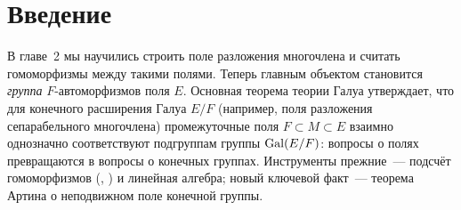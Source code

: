 \section*{Введение}

В главе~2 мы научились строить поле разложения многочлена и считать гомоморфизмы между такими полями. Теперь главным
объектом становится \emph{группа} $F$-автоморфизмов поля $E$. Основная теорема теории Галуа утверждает, что для
конечного расширения Галуа $E/F$ (например, поля разложения сепарабельного многочлена) промежуточные поля $F\subset M\subset E$
взаимно однозначно соответствуют подгруппам группы $\operatorname{Gal}(E/F)$: вопросы о полях превращаются в вопросы о конечных
группах. Инструменты прежние~--- подсчёт гомоморфизмов (, ) и линейная алгебра; новый ключевой факт~---
теорема Артина о неподвижном поле конечной группы.

